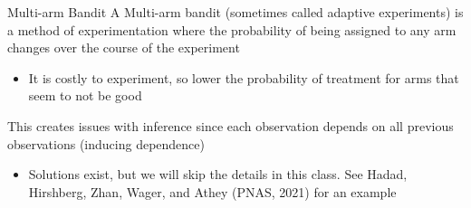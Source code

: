 \documentclass[aspectratio=169,t,11pt,table]{beamer}
\begin{document}
\begin{frame}{Multi-arm Bandit}
	A \alert{Multi-arm bandit} (sometimes called adaptive experiments) is a method of experimentation where the probability of being assigned to any arm changes over the course of the experiment
	\begin{itemize}
		\item It is costly to experiment, so lower the probability of treatment for arms that seem to not be good
	\end{itemize}

	\pause
	\bigskip
	This creates issues with inference since each observation depends on all previous observations (inducing dependence)
	\begin{itemize}
		\item Solutions exist, but we will skip the details in this class. See Hadad, Hirshberg, Zhan, Wager, and Athey (PNAS, 2021) for an example
	\end{itemize}
\end{frame}


\end{document}
